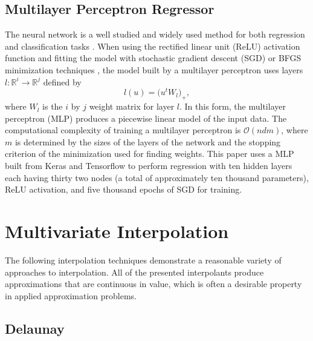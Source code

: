 \documentclass[smallextended,final]{svjour3}       %
\begin{document}
\subsection{Multilayer Perceptron Regressor}
\label{sec:mlp}
The neural network is a well studied and widely used method for both
regression and classification tasks
\cite{rumelhart1988learning,hornik1989multilayer}. When using the
rectified linear unit (ReLU) activation function
\cite{dahl2013improving} and fitting the model with stochastic
gradient descent (SGD) or BFGS minimization techniques
\cite{goh2017why,moller1993scaled,robbins1951stochastic}, the model
built by a multilayer perceptron uses layers $l : \mathbb{R}^{i}
\rightarrow \mathbb{R}^{j}$ defined by
$$ l(u) = \bigl( u^t W_l \bigr)_+ ,$$
where $W_l$ is the $i$ by $j$ weight matrix for layer $l$. In this
form, the multilayer perceptron (MLP) produces a piecewise linear
model of the input data. The computational complexity of training a
multilayer perceptron is $\mathcal{O}(n d m)$, where $m$ is determined
by the sizes of the layers of the network and the stopping criterion
of the minimization used for finding weights. This paper uses a MLP
built from Keras and Tensorflow to perform regression
\cite{chollet2015keras,tensorflow2015-whitepaper} with ten hidden
layers each having thirty two nodes (a total of approximately ten
thousand parameters), ReLU activation, and five thousand epochs of SGD
for training.

\section{Multivariate Interpolation}
\label{sec:interpolation}
The following interpolation techniques demonstrate a reasonable
variety of approaches to interpolation. All of the presented
interpolants produce approximations that are continuous in value,
which is often a desirable property in applied approximation problems.

\subsection{Delaunay}
\label{sec:delaunay}
\end{document}
